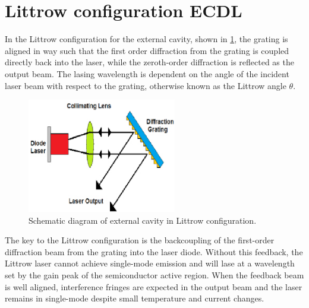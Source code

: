 	\section{Littrow configuration ECDL}\label{Littrowsection}
In the Littrow configuration for the external cavity, shown in \cref{littrow2}, the grating is aligned in way such that the first order diffraction from the grating is coupled directly back into the laser, while the zeroth-order diffraction is reflected as the output beam. The lasing wavelength is dependent on the angle of the incident laser beam with respect to the grating, otherwise known as the Littrow angle $\theta$.

\begin{figure}[!t]
\centering
\includegraphics[width=\linewidth, height=5cm, draft=\foto]{eps/littrow2.eps}
\caption{Schematic diagram of external cavity in Littrow configuration.}
\label{littrow2}
\end{figure}

The key to the Littrow configuration is the backcoupling of the first-order diffraction beam from the grating into the laser diode. Without this feedback, the Littrow laser cannot achieve single-mode emission and will lase at a wavelength set by the gain peak of the semiconductor active region. When the feedback beam is well aligned, interference fringes are expected in the output beam and the laser remains in single-mode despite small temperature and current changes.

